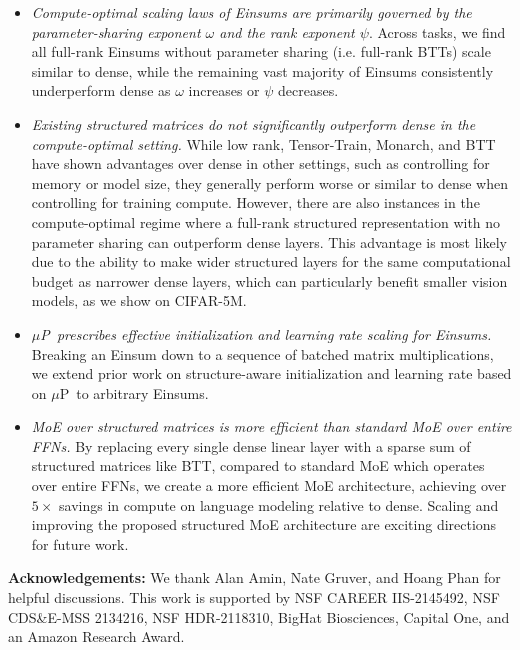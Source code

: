 \documentclass{article}
\newcommand{\mup}{$\mu$P}
\begin{document}
\begin{itemize}
    \item \textit{Compute-optimal scaling laws of Einsums are primarily governed by the parameter-sharing exponent $\omega$ and the rank exponent $\psi.$} Across tasks, we find all full-rank Einsums without parameter sharing (i.e. full-rank BTTs) scale similar to dense, while the remaining vast majority of Einsums consistently underperform dense as $\omega$ increases or $\psi$ decreases.
    \item \textit{Existing structured matrices do not significantly outperform dense in the compute-optimal setting.} While low rank, Tensor-Train, Monarch, and BTT have shown advantages over dense in other settings, such as controlling for memory or model size, they generally perform worse or similar to dense when controlling for training compute. However, there are also instances in the compute-optimal regime where a full-rank structured representation with no parameter sharing can outperform dense layers. This advantage is most likely due to the ability to make wider structured layers for the same computational budget as narrower dense layers, which can particularly benefit smaller vision models, as we show on CIFAR-5M.
        \item \textit{\mup\ prescribes effective initialization and learning rate scaling for Einsums.} Breaking an Einsum down to a sequence of batched matrix multiplications, we extend prior work on structure-aware initialization and learning rate based on \mup\ to arbitrary Einsums.
    \item \textit{MoE over structured matrices is more efficient than standard MoE over entire FFNs.} By replacing every single dense linear layer with a sparse sum of structured matrices like BTT, compared to standard MoE which operates over entire FFNs, we create a more efficient MoE architecture, achieving over $5\times$ savings in compute on language modeling relative to dense. Scaling and improving the proposed structured MoE architecture are exciting directions for future work.
\end{itemize}

\textbf{Acknowledgements:}
We thank Alan Amin, Nate Gruver, and Hoang Phan for helpful discussions. This work is supported by NSF CAREER IIS-2145492, NSF CDS\&E-MSS 2134216, NSF HDR-2118310, BigHat Biosciences, Capital One, and an Amazon Research Award.

\clearpage



\end{document}
